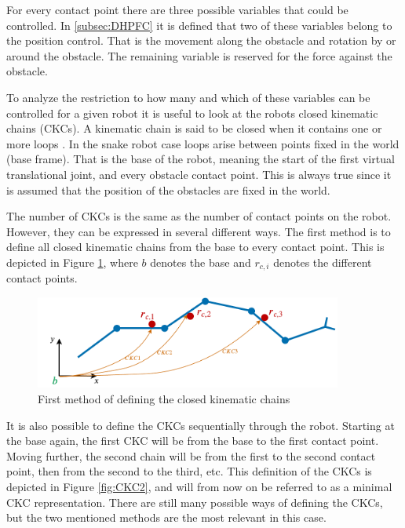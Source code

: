 For every contact point there are three possible variables that could be controlled. In \ref{subsec:DHPFC} it is defined that two of these variables belong to the position control. That is the movement along the obstacle and rotation by or around the obstacle. The remaining variable is reserved for the force against the obstacle.

To analyze the restriction to how many and which of these variables can be controlled for a given robot it is useful to look at the robots closed kinematic chains (CKCs). A kinematic chain is said to be closed when it contains one or more loops \cite{lynch2017modern}. In the snake robot case loops arise between points fixed in the world (base frame). That is the base of the robot, meaning the start of the first virtual translational joint, and every obstacle contact point. This is always true since it is assumed that the position of the obstacles are fixed in the world.

The number of CKCs is the same as the number of contact points on the robot. However, they can be expressed in several different ways. The first method is to define all closed kinematic chains from the base to every contact point. This is depicted in Figure \ref{fig:CKC1}, where $b$ denotes the base and $r_{c,i}$ denotes the different contact points.

\begin{figure}
    \centering
    \includegraphics[width=0.9\textwidth]{figures/theory/CKC1.pdf}
    \caption{First method of defining the closed kinematic chains}
    \label{fig:CKC1}
\end{figure}

It is also possible to define the CKCs sequentially through the robot. Starting at the base again, the first CKC will be from the base to the first contact point. Moving further, the second chain will be from the first to the second contact point, then from the second to the third, etc. This definition of the CKCs is depicted in Figure \ref{fig:CKC2}, and will from now on be referred to as a minimal CKC representation. There are still many possible ways of defining the CKCs, but the two mentioned methods are the most relevant in this case.

